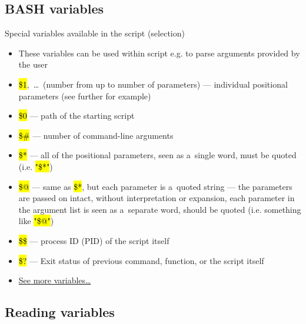\documentclass[compress, ucs, xelatex, 11pt, xcolor=svgnames, aspectratio=169,
	hyperref={
		bookmarks=true,
		unicode=true,
		colorlinks=true,
		pdftitle={Linux, command line and MetaCentrum},
		plainpages=false,
		pdfauthor={Vojtech Zeisek},
		pdfsubject={Course about use of Linux command line, writing shell scripts and using MetaCentrum of CESNET},
		pdfcreator={XeLaTeX},
		pdfkeywords={Linux, GNU, BASH, shell, command line, MetaCentrum},
		linkcolor=DarkRed, %
		anchorcolor=DarkBlue, %
		citecolor=Indigo, %
		filecolor=NavyBlue, %
		menucolor=DarkMagenta, %
		urlcolor=DarkBlue, %
		pdftex},
	url={hyphens, lowtilde} %
	]{beamer}
\renewcommand{\texttt}[1]{\hl{\ttfamily #1}}
\renewcommand{\alert}[1]{\textcolor{red}{#1}}
\begin{document}
\subsection{BASH variables}

\begin{frame}{Special variables available in the script (selection)}
	\begin{itemize}
		\item These variables can be used within script e.g. to parse arguments provided by the user
		\item \alert{\texttt{\$1}},~\ldots~(number from \texttt{1} up to number of parameters) --- individual positional parameters (see further for example)
		\item \alert{\texttt{\$0}} --- path of the starting script
		\item \alert{\texttt{\$\#}} --- number of command-line arguments
		\item \alert{\texttt{\$*}} --- all of the positional parameters, seen as a~single word, must be quoted (i.e. \texttt{"\$*"})
		\item \alert{\texttt{\$@}} --- same as \texttt{\$*}, but each parameter is a~quoted string --- the parameters are passed on intact, without interpretation or expansion, each parameter in the argument list is seen as a~separate word, should be quoted (i.e. something like \texttt{"\$@"})
		\item \alert{\texttt{\$\$}} --- process ID (PID) of the script itself
		\item \alert{\texttt{\$?}} --- Exit status of previous command, function, or the script itself
		\item \href{https://www.tldp.org/LDP/abs/html/internalvariables.html}{See more variables\ldots}
	\end{itemize}
\end{frame}

\subsection{Reading variables}
\end{document}
